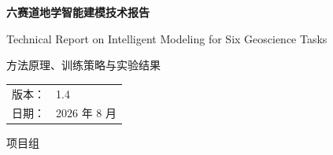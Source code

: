 \documentclass[UTF8,11pt,openany]{ctexrep}
\newcommand{\ReportVersion}{1.4}
\begin{document}
\begin{titlepage}
  \centering
  \vspace*{2.2cm}
  {\Huge\bfseries\color{YonganNavy} 六赛道地学智能建模技术报告\par}
  \vspace{0.6cm}
  {\Large Technical Report on Intelligent Modeling for Six Geoscience Tasks\par}
  \vspace{1.6cm}
  {\large 方法原理、训练策略与实验结果\par}
  \vfill
  \begin{tabular}{rl}
    版本： & \ReportVersion \\
    日期： & 2026 年 8 月 \\
  \end{tabular}
  \vfill
  {\large 项目组\par}
\end{titlepage}

\tableofcontents
\listoffigures
\clearpage
{}











\appendix


\renewcommand{\bibname}{参考文献}


\end{document}
